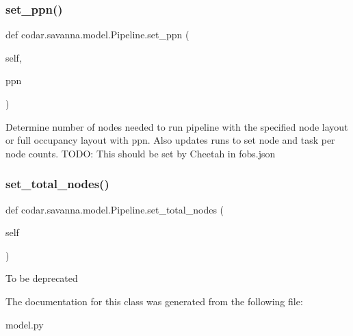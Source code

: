 \subsubsection{\texorpdfstring{set\+\_\+ppn()}{set\_ppn()}}
{\footnotesize\ttfamily def codar.\+savanna.\+model.\+Pipeline.\+set\+\_\+ppn (\begin{DoxyParamCaption}\item[{}]{self,  }\item[{}]{ppn }\end{DoxyParamCaption})}

\begin{DoxyVerb}Determine number of nodes needed to run pipeline with the specified
node layout or full occupancy layout with ppn. Also updates runs
to set node and task per node counts.
TODO: This should be set by Cheetah in fobs.json\end{DoxyVerb}
 \mbox{\label{classcodar_1_1savanna_1_1model_1_1_pipeline_a372fa98a663eccfd0c629e9e92f411f8}} 
\subsubsection{\texorpdfstring{set\+\_\+total\+\_\+nodes()}{set\_total\_nodes()}}
{\footnotesize\ttfamily def codar.\+savanna.\+model.\+Pipeline.\+set\+\_\+total\+\_\+nodes (\begin{DoxyParamCaption}\item[{}]{self }\end{DoxyParamCaption})}

\begin{DoxyVerb}To be deprecated
\end{DoxyVerb}
 

The documentation for this class was generated from the following file\+:\begin{DoxyCompactItemize}
\item 
model.\+py\end{DoxyCompactItemize}
